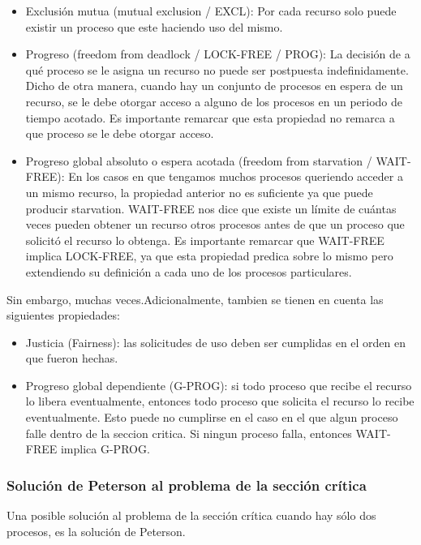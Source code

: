 \documentclass{article}
\begin{document}
\begin{itemize}
\item Exclusión mutua (mutual exclusion / EXCL): Por cada recurso solo puede existir un proceso que este haciendo uso del mismo.
\item Progreso (freedom from deadlock / LOCK-FREE / PROG): La decisi\'on de a qu\'e proceso se le asigna un recurso no puede ser postpuesta indefinidamente. Dicho de otra manera, cuando hay un conjunto de procesos en espera de un recurso, se le debe otorgar acceso a alguno de los procesos en un periodo de tiempo acotado. Es importante remarcar que esta propiedad no remarca a que proceso se le debe otorgar acceso.
\item Progreso global absoluto o espera acotada (freedom from starvation / WAIT-FREE): En los casos en que tengamos muchos procesos queriendo acceder a un mismo recurso, la propiedad anterior no es suficiente ya que puede producir starvation. WAIT-FREE nos dice que existe un l\'imite de cu\'antas veces pueden obtener un recurso otros procesos antes de que un proceso que solicitó el recurso lo obtenga. Es importante remarcar que WAIT-FREE implica LOCK-FREE, ya que esta propiedad predica sobre lo mismo pero extendiendo su definición a cada uno de los procesos particulares.
\end{itemize}



Sin embargo, muchas veces.Adicionalmente, tambien se tienen en cuenta las siguientes propiedades:
\begin{itemize}
 \item Justicia (Fairness): las solicitudes de uso deben ser cumplidas en el orden en que fueron hechas.
 \item Progreso global dependiente (G-PROG): si todo proceso que recibe el recurso lo libera eventualmente, entonces todo proceso que solicita el recurso lo recibe eventualmente. Esto puede no cumplirse en el caso en el que algun proceso falle dentro de la seccion critica. Si ningun proceso falla, entonces WAIT-FREE implica G-PROG.
\end{itemize}


\subsubsection{Soluci\'on de Peterson al problema de la secci\'on cr\'itica}

Una posible soluci\'on al problema de la secci\'on cr\'itica cuando hay s\'olo dos procesos, es la soluci\'on de Peterson.
\end{document}

